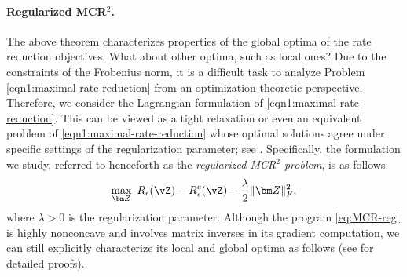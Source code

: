 \documentclass[../../book-main.tex]{subfiles}
\begin{document}
\paragraph{Regularized MCR$^2$.}
The above theorem characterizes properties of the global optima of
the rate reduction objectives. What about other optima, such as local
ones?  Due to the constraints of the Frobenius norm, it is a
difficult task to analyze Problem \eqref{eqn1:maximal-rate-reduction}
from an optimization-theoretic perspective. Therefore, we consider
the Lagrangian formulation of \eqref{eqn1:maximal-rate-reduction}.
This can be viewed as a tight relaxation or even an equivalent
problem of \eqref{eqn1:maximal-rate-reduction} whose optimal
solutions agree under specific settings of the regularization
parameter; see \cite[Proposition 3.2]{wang2024global}.
Specifically, the formulation we study, referred to henceforth as the
\textit{regularized MCR$^2$ problem}, is as follows:
\begin{align}\label{eq:MCR-reg}
    \max_{\bm Z}\ R_{\epsilon}(\vZ) - R_{\epsilon}^c(\vZ) -
    \frac{\lambda}{2}\|\bm Z\|_F^2,
\end{align}
where $\lambda > 0$ is the regularization parameter. Although the
program  \eqref{eq:MCR-reg} is highly nonconcave and involves matrix
inverses in its gradient computation, we can still explicitly
characterize its local and global optima as follows (see
\cite[Theorem 3.1]{wang2024global} for detailed proofs).
\end{document}
